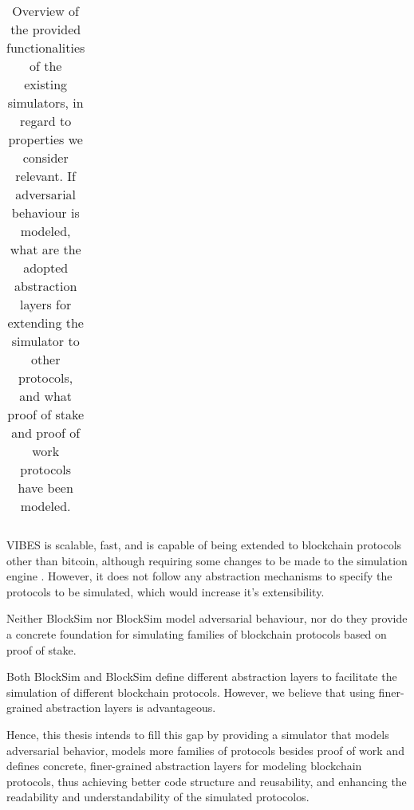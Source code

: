 \begin{table}[h]
\begin{tabular}{|c|c|c|c|c|}
\end{tabular}
\caption{Overview of the provided functionalities of the existing simulators, in regard to properties we consider relevant. If adversarial behaviour is modeled, what are the adopted abstraction layers for extending the simulator to other protocols, and what proof of stake and proof of work protocols have been modeled.}
\end{table}

VIBES \cite{vibes} is scalable, fast, and is capable of being extended to blockchain protocols other than bitcoin, although requiring some changes to be made to the simulation engine \cite{evibes}. However, it does not follow any abstraction mechanisms to specify the protocols to be simulated, which would increase it’s extensibility.

Neither BlockSim \cite{blocksim1} nor BlockSim \cite{blocksim2} model adversarial behaviour, nor do they provide a concrete foundation for simulating families of blockchain protocols based on proof of stake.

Both BlockSim \cite{blocksim1} and BlockSim \cite{blocksim2} define different abstraction layers to facilitate the simulation of different blockchain protocols. However, we believe that using finer-grained abstraction layers is advantageous.

\vspace{0.25cm}

Hence, this thesis intends to fill this gap by providing a simulator that models adversarial behavior, models more families of protocols besides proof of work and defines concrete, finer-grained abstraction layers for modeling blockchain protocols, thus achieving better code structure and reusability, and enhancing the readability and understandability of the simulated protocolos.


